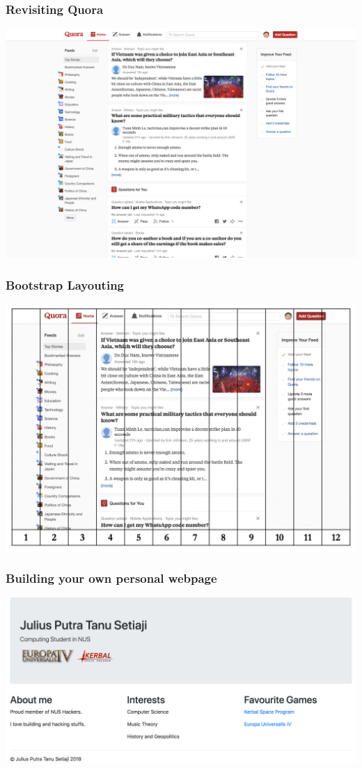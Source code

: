 \documentclass[12pt]{beamer}
\begin{document}
\begin{frame}
\frametitle{Revisiting Quora}
\begin{center}
	\includegraphics[width=\linewidth]{quora}
\end{center}
\end{frame}

\begin{frame}
\frametitle{Bootstrap Layouting}
\begin{center}
	\includegraphics[width=0.95\linewidth]{quora-12}
\end{center}
\end{frame}

\begin{frame}
\frametitle{Building your own personal webpage}
\includegraphics[width=\linewidth]{website}
\end{frame}
\end{document}
